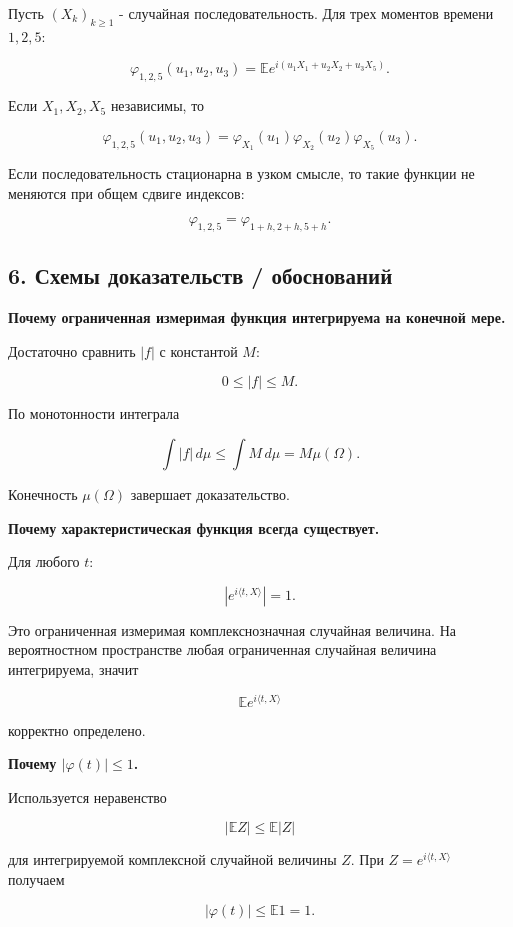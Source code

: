 \documentclass[
  11pt,
  a4paper,
]{article}
\begin{document}
Пусть \((X_k)_{k\ge1}\) - случайная последовательность. Для трех
моментов времени \(1,2,5\):

\[
\varphi_{1,2,5}(u_1,u_2,u_3)
=
\mathbb E e^{i(u_1X_1+u_2X_2+u_3X_5)}.
\]

Если \(X_1,X_2,X_5\) независимы, то

\[
\varphi_{1,2,5}(u_1,u_2,u_3)
=
\varphi_{X_1}(u_1)\varphi_{X_2}(u_2)\varphi_{X_5}(u_3).
\]

Если последовательность стационарна в узком смысле, то такие функции не
меняются при общем сдвиге индексов:

\[
\varphi_{1,2,5}=\varphi_{1+h,2+h,5+h}.
\]

\subsection{6. Схемы доказательств /
обоснований}\label{ux441ux445ux435ux43cux44b-ux434ux43eux43aux430ux437ux430ux442ux435ux43bux44cux441ux442ux432-ux43eux431ux43eux441ux43dux43eux432ux430ux43dux438ux439}

\textbf{Почему ограниченная измеримая функция интегрируема на конечной
мере.}

Достаточно сравнить \(|f|\) с константой \(M\):

\[
0\le |f|\le M.
\]

По монотонности интеграла

\[
\int |f|\,d\mu\le \int M\,d\mu=M\mu(\Omega).
\]

Конечность \(\mu(\Omega)\) завершает доказательство.

\textbf{Почему характеристическая функция всегда существует.}

Для любого \(t\):

\[
\left|e^{i\langle t,X\rangle}\right|=1.
\]

Это ограниченная измеримая комплекснозначная случайная величина. На
вероятностном пространстве любая ограниченная случайная величина
интегрируема, значит

\[
\mathbb E e^{i\langle t,X\rangle}
\]

корректно определено.

\textbf{Почему \(|\varphi(t)|\le1\).}

Используется неравенство

\[
|\mathbb EZ|\le\mathbb E|Z|
\]

для интегрируемой комплексной случайной величины \(Z\). При
\(Z=e^{i\langle t,X\rangle}\) получаем

\[
|\varphi(t)|\le \mathbb E1=1.
\]
\end{document}
